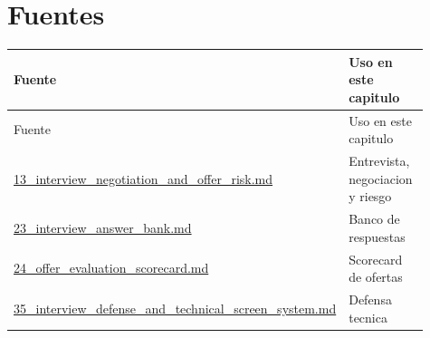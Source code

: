 \section{Fuentes}


\begin{center}
\scriptsize
\begin{longtable}{>{\raggedright\arraybackslash}p{0.455\linewidth} >{\raggedright\arraybackslash}p{0.455\linewidth}}
\toprule
Fuente & Uso en este capitulo \\
\midrule
\endfirsthead
\toprule
Fuente & Uso en este capitulo \\
\midrule
\endhead
\href{file:///E:/Laboral/13_interview_negotiation_and_offer_risk.md}{13\_interview\_negotiation\_and\_offer\_risk.md} & Entrevista, negociacion y riesgo \\
\href{file:///E:/Laboral/23_interview_answer_bank.md}{23\_interview\_answer\_bank.md} & Banco de respuestas \\
\href{file:///E:/Laboral/24_offer_evaluation_scorecard.md}{24\_offer\_evaluation\_scorecard.md} & Scorecard de ofertas \\
\href{file:///E:/Laboral/35_interview_defense_and_technical_screen_system.md}{35\_interview\_defense\_and\_technical\_screen\_system.md} & Defensa tecnica \\
\bottomrule
\end{longtable}
\end{center}



